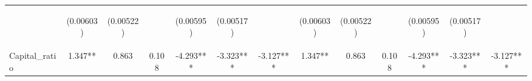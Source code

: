 \documentclass[]{article}
\begin{document}
\begin{center}
\begin{tabular}{lcccccccccccc}
\vspace{4pt} & \begin{footnotesize}(0.00603)\end{footnotesize} & \begin{footnotesize}(0.00522)\end{footnotesize} & \begin{footnotesize}\end{footnotesize} & \begin{footnotesize}(0.00595)\end{footnotesize} & \begin{footnotesize}(0.00517)\end{footnotesize} & \begin{footnotesize}\end{footnotesize} & \begin{footnotesize}(0.00603)\end{footnotesize} & \begin{footnotesize}(0.00522)\end{footnotesize} & \begin{footnotesize}\end{footnotesize} & \begin{footnotesize}(0.00595)\end{footnotesize} & \begin{footnotesize}(0.00517)\end{footnotesize} & \begin{footnotesize}\end{footnotesize} \\
Capital\_ratio & 1.347** & 0.863 & 0.108 & -4.293*** & -3.323*** & -3.127*** & 1.347** & 0.863 & 0.108 & -4.293*** & -3.323*** & -3.127*** \\

\end{tabular}
\end{center}
\end{document}
